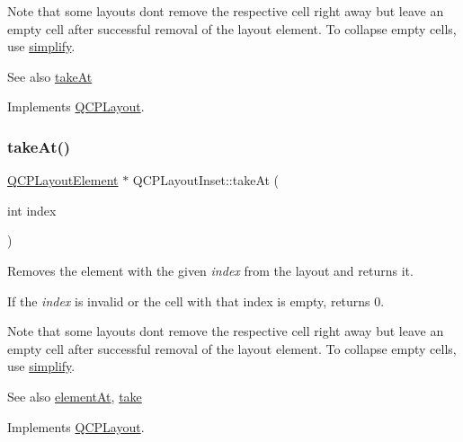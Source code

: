 Note that some layouts don\textquotesingle{}t remove the respective cell right away but leave an empty cell after successful removal of the layout element. To collapse empty cells, use \hyperlink{class_q_c_p_layout_inset_a18b7d508f0baa60cc5dcb1343cf7f32a}{simplify}.

\begin{DoxySeeAlso}{See also}
\hyperlink{class_q_c_p_layout_inset_abf2e8233f5b7051220907e62ded490a2}{take\+At} 
\end{DoxySeeAlso}


Implements \hyperlink{class_q_c_p_layout_ada26cd17e56472b0b4d7fbbc96873e4c}{Q\+C\+P\+Layout}.

\mbox{\label{class_q_c_p_layout_inset_abf2e8233f5b7051220907e62ded490a2}} 
\subsubsection{\texorpdfstring{take\+At()}{takeAt()}}
{\footnotesize\ttfamily \hyperlink{class_q_c_p_layout_element}{Q\+C\+P\+Layout\+Element} $\ast$ Q\+C\+P\+Layout\+Inset\+::take\+At (\begin{DoxyParamCaption}\item[{int}]{index }\end{DoxyParamCaption})\hspace{0.3cm}{\ttfamily [virtual]}}

Removes the element with the given {\itshape index} from the layout and returns it.

If the {\itshape index} is invalid or the cell with that index is empty, returns 0.

Note that some layouts don\textquotesingle{}t remove the respective cell right away but leave an empty cell after successful removal of the layout element. To collapse empty cells, use \hyperlink{class_q_c_p_layout_inset_a18b7d508f0baa60cc5dcb1343cf7f32a}{simplify}.

\begin{DoxySeeAlso}{See also}
\hyperlink{class_q_c_p_layout_inset_a881ca205605bae9c034733b808f93a02}{element\+At}, \hyperlink{class_q_c_p_layout_inset_af7f13cc369f8190b5e7e17d5f39dfe1c}{take} 
\end{DoxySeeAlso}


Implements \hyperlink{class_q_c_p_layout_a5a79621fa0a6eabb8b520cfc04fb601a}{Q\+C\+P\+Layout}.

